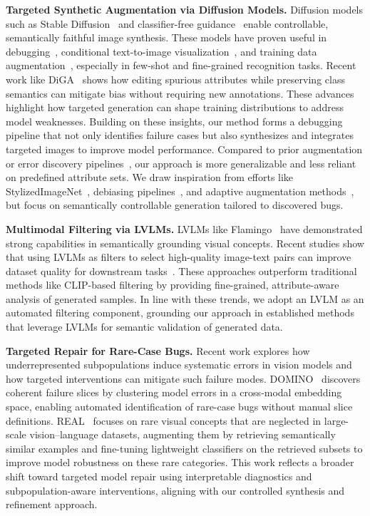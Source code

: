 \documentclass[10pt]{article} %
\begin{document}
\noindent\textbf{Targeted Synthetic Augmentation via Diffusion Models.}
Diffusion models such as Stable Diffusion~\citep{rombach2022high} and classifier-free guidance~\citep{ho2022classifierfree} enable controllable, semantically faithful image synthesis. These models have proven useful in debugging~\citep{casper2022robust, fang2024data, huang2024data}, conditional text-to-image visualization~\citep{augustin2022diffusion, boreiko2022sparse}, and training data augmentation~\citep{trabucco2023effective, dunlap2023diversify}, especially in few-shot and fine-grained recognition tasks. Recent work like DiGA~\citep{zhang2024distributionally} shows how editing spurious attributes while preserving class semantics can mitigate bias without requiring new annotations. These advances highlight how targeted generation can shape training distributions to address model weaknesses. Building on these insights, our method forms a debugging pipeline that not only identifies failure cases but also synthesizes and integrates targeted images to improve model performance. Compared to prior augmentation or error discovery pipelines~\citep{fang2024data, huang2024data, chen2023hibug}, our approach is more generalizable and less reliant on predefined attribute sets. We draw inspiration from efforts like StylizedImageNet~\citep{geirhos2019imagenet}, debiasing pipelines~\citep{jin2021background}, and adaptive augmentation methods~\citep{mikolajczyk2023targeted, zhao2022adaptive, wang2024domain}, but focus on semantically controllable generation tailored to discovered bugs. 

\noindent\textbf{Multimodal Filtering via LVLMs.} LVLMs like Flamingo~\citep{alayrac2022flamingo} have demonstrated strong capabilities in semantically grounding visual concepts. Recent studies show that using LVLMs as filters to select high-quality image-text pairs can improve dataset quality for downstream tasks~\citep{wang2024finetuned, chen2024self}. These approaches outperform traditional methods like CLIP-based filtering by providing fine-grained, attribute-aware analysis of generated samples. In line with these trends, we adopt an LVLM as an automated filtering component, grounding our approach in established methods that leverage LVLMs for semantic validation of generated data.

\noindent\textbf{Targeted Repair for Rare-Case Bugs.}  
Recent work explores how underrepresented subpopulations induce systematic errors in vision models and how targeted interventions can mitigate such failure modes. DOMINO~\citep{eyuboglu2022rare} discovers coherent failure slices by clustering model errors in a cross‑modal embedding space, enabling automated identification of rare-case bugs without manual slice definitions.
REAL~\citep{parashar2024neglected} focuses on rare visual concepts that are neglected in large-scale vision--language datasets, augmenting them by retrieving semantically similar examples and fine-tuning lightweight classifiers on the retrieved subsets to improve model robustness on these rare categories.
This work reflects a broader shift toward targeted model repair using interpretable diagnostics and subpopulation-aware interventions, aligning with our controlled synthesis and refinement approach.
\end{document}
